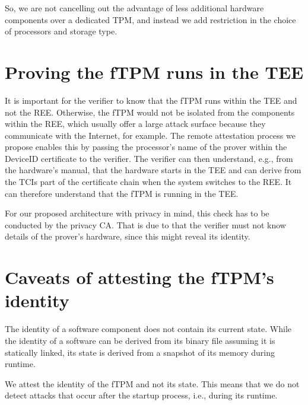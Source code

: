 So, we are not cancelling out the advantage of less additional hardware components over a dedicated TPM, and instead we add restriction in the choice of processors and storage type.




\section{Proving the fTPM runs in the TEE}

It is important for the verifier to know that the fTPM runs within the TEE and not the REE\@.
Otherwise, the fTPM would not be isolated from the components within the REE, which usually offer a large attack surface because they communicate with the Internet, for example.
The remote attestation process we propose enables this by passing the processor's name of the prover within the DeviceID certificate to the verifier.
The verifier can then understand, e.g., from the hardware's manual, that the hardware starts in the TEE and can derive from the TCIs part of the certificate chain when the system switches to the REE\@.
It can therefore understand that the fTPM is running in the TEE\@.

For our proposed architecture with privacy in mind, this check has to be conducted by the privacy CA\@.
That is due to that the verifier must not know details of the prover's hardware, since this might reveal its identity.

\section{Caveats of attesting the fTPM's identity}

The identity of a software component does not contain its current state.
While the identity of a software can be derived from its binary file assuming it is statically linked, its state is derived from a snapshot of its memory during runtime.

We attest the identity of the fTPM and not its state.
This means that we do not detect attacks that occur after the startup process, i.e., during its runtime.

